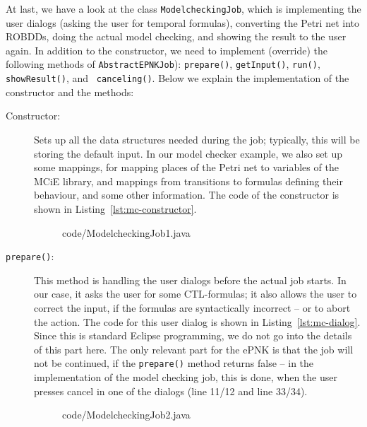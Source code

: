 At last, we have a look at the class {\tt ModelcheckingJob}, which
is implementing the user dialogs (asking the user for temporal formulas),
converting the Petri net into ROBDDs, doing the actual model checking,
and showing the result to the user again. In addition to the constructor,
we need to implement (override) the following methods of
{\tt AbstractEPNKJob}):%
{\tt prepare()}, {\tt getInput()}, {\tt run()}, {\tt showResult()}, and {\tt
canceling()}. Below we explain the implementation of the constructor and the
methods:
\begin{description}
\item[Constructor:] Sets up all the data structures needed during the job;
    typically, this will be storing the default input. In our model checker
    example, we also set up some mappings, for mapping places of the
    Petri net to variables of the MCiE library, and mappings from transitions    
    to formulas defining their behaviour, and some other information.
    The code of the constructor is shown in Listing~\ref{lst:mc-constructor}.
\begin{figure}[tbp!] %
%
{code/ModelcheckingJob1.java}
\end{figure}

\item[{\tt prepare()}:] This method is handling the user dialogs before the
    actual job starts. In our case, it asks the user for some CTL-formulas;
    it also allows the user to correct the input, if the formulas are
    syntactically incorrect -- or to abort the action. The code for this
    user dialog is shown in Listing~\ref{lst:mc-dialog}. Since this is
    standard Eclipse programming, we do not go into the details of
    this part here. The only relevant part for the ePNK is that the
    job will not be continued, if the {\tt prepare()} method returns false --
    in the implementation of the model checking job, this is done, when
    the user presses cancel in one of the dialogs (line 11/12 and line 33/34).
  
\begin{figure}[htbp!]
%
{code/ModelcheckingJob2.java}
\end{figure}    


\end{description}
